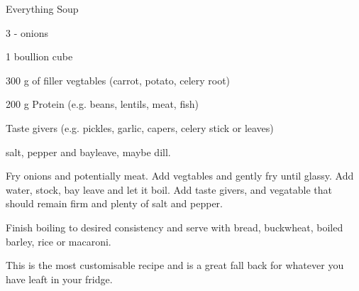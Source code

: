 \begin{recipe}{Everything Soup}
    \begin{ingr}[2-3]
    \item 3 - onions
    \item 1 boullion cube
    \item 300 g of filler vegtables (carrot, potato, celery root)
    \item 200 g Protein (e.g. beans, lentils, meat, fish)
    \item Taste givers (e.g. pickles, garlic, capers, celery stick
        or leaves)
    \item salt, pepper and bayleave, maybe dill.
    \end{ingr}

    Fry onions and potentially meat. Add vegtables and gently fry until
    glassy. Add water, stock, bay leave and let it boil. Add taste givers,
    and vegatable that should remain firm and plenty of salt and pepper.

    Finish boiling to desired consistency and serve with bread, buckwheat,
    boiled barley, rice or macaroni.

    This is the most customisable recipe and is a great fall back for
    whatever you have leaft in your fridge.
\end{recipe}
